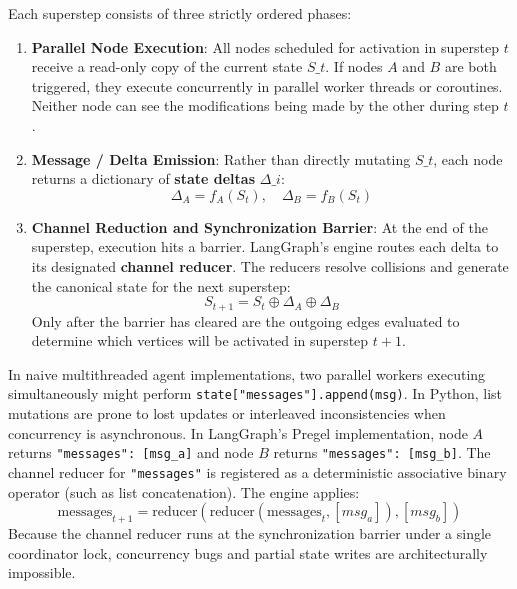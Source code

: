 Each superstep consists of three strictly ordered phases:
\begin{enumerate}[leftmargin=18pt]
  \item \textbf{Parallel Node Execution}: All nodes scheduled for activation in superstep $t$ receive a read-only copy of the current state $S\_t$. If nodes $A$ and $B$ are both triggered, they execute concurrently in parallel worker threads or coroutines. Neither node can see the modifications being made by the other during step $t$.
  \item \textbf{Message / Delta Emission}: Rather than directly mutating $S\_t$, each node returns a dictionary of \textbf{state deltas} $\Delta\_i$:
  \begin{equation}
  \Delta_A = f_A(S_t), \quad \Delta_B = f_B(S_t)
  \end{equation}
  \item \textbf{Channel Reduction and Synchronization Barrier}: At the end of the superstep, execution hits a barrier. LangGraph's engine routes each delta to its designated \textbf{channel reducer}. The reducers resolve collisions and generate the canonical state for the next superstep:
  \begin{equation}
  S_{t+1} = S_t \oplus \Delta_A \oplus \Delta_B
  \end{equation}
  Only after the barrier has cleared are the outgoing edges evaluated to determine which vertices will be activated in superstep $t+1$.
\end{enumerate}

\begin{underthehoodbox}
In naive multithreaded agent implementations, two parallel workers executing simultaneously might perform \texttt{state["messages"].append(msg)}. In Python, list mutations are prone to lost updates or interleaved inconsistencies when concurrency is asynchronous.
In LangGraph's Pregel implementation, node $A$ returns \texttt{{"messages": [msg\_a]}} and node $B$ returns \texttt{{"messages": [msg\_b]}}. The channel reducer for \texttt{"messages"} is registered as a deterministic associative binary operator (such as list concatenation). The engine applies:
\[
\text{messages}_{t+1} = \text{reducer}(\text{reducer}(\text{messages}_t, [msg_a]), [msg_b])
\]
Because the channel reducer runs at the synchronization barrier under a single coordinator lock, concurrency bugs and partial state writes are architecturally impossible.
\end{underthehoodbox}

